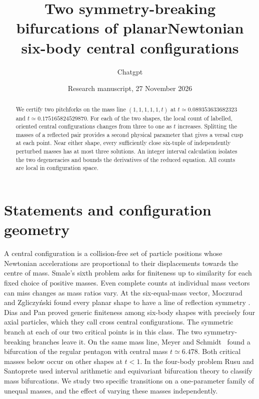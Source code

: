 \documentclass[11pt]{article}
\title{Two symmetry-breaking bifurcations of planar\newline Newtonian six-body central configurations}
\author{Chatgpt}
\date{Research manuscript, 27 November 2026}
\begin{document}
\maketitle
\begin{abstract}
We certify two pitchforks on the mass line $(1,1,1,1,1,t)$ at
$t\simeq0.089353633682323$ and $t\simeq0.175165824529870$.
For each of the two shapes, the local count of labelled, oriented central
configurations changes from three to one as $t$ increases. Splitting the
masses of a reflected pair provides a second physical parameter that gives a
versal cusp at each point. Near either shape, every sufficiently close
six-tuple of independently perturbed masses has at most three solutions.
An integer interval calculation isolates the two degeneracies and bounds the
derivatives of the reduced equation. All counts are local in configuration
space.
\end{abstract}

\section{Statements and configuration geometry}
A central configuration is a collision-free set of particle positions whose
Newtonian accelerations are proportional to their displacements towards
the centre of mass. Smale's sixth problem asks for finiteness up to
similarity for each fixed choice of positive masses. Even complete counts
at individual mass vectors can miss changes as mass ratios vary. At the
six-equal-mass vector, Moczurad and Zgliczy\'nski found every planar shape
to have a line of reflection symmetry \cite{mz}. Dias and Pan \cite{dp}
proved generic finiteness among six-body shapes with precisely four axial
particles, which they call cross central configurations. The symmetric
branch at each of our two critical points is in this class. The two
symmetry-breaking branches leave it. On the same mass line, Meyer and
Schmidt~\cite[Sec.~5 and Appendices~A--C]{meyerschmidt} found a
bifurcation of the regular pentagon with central mass $t\simeq6.478$.
Both critical masses below occur on other shapes at $t<1$. In the four-body
problem Rusu and Santoprete \cite{rs} used interval arithmetic and
equivariant bifurcation theory to classify mass bifurcations. We study two specific
transitions on a one-parameter family of unequal masses, and the effect of
varying these masses independently.
\end{document}
